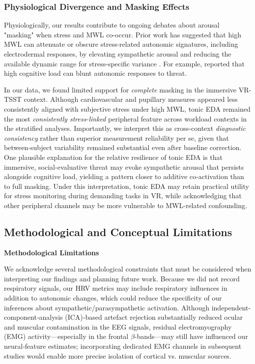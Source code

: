 \documentclass[lettersize,journal]{IEEEtran}
\begin{document}
\subsubsection{Physiological Divergence and Masking Effects}
Physiologically, our results contribute to ongoing debates about arousal "masking" when stress and MWL co-occur. Prior work has suggested that high MWL can attenuate or obscure stress-related autonomic signatures, including electrodermal responses, by elevating sympathetic arousal and reducing the available dynamic range for stress-specific variance \cite{conwayEffectMentalWorkload2013, setzDiscriminatingStressCognitive2010}. For example, \cite{conwayEffectMentalWorkload2013} reported that high cognitive load can blunt autonomic responses to threat.

In our data, we found limited support for \emph{complete} masking in the immersive VR-TSST context. Although cardiovascular and pupillary measures appeared less consistently aligned with subjective stress under high MWL, tonic EDA remained the most \emph{consistently stress-linked} peripheral feature across workload contexts in the stratified analyses. Importantly, we interpret this as cross-context \emph{diagnostic consistency} rather than superior measurement reliability per se, given that between-subject variability remained substantial even after baseline correction. One plausible explanation for the relative resilience of tonic EDA is that immersive, social-evaluative threat may evoke sympathetic arousal that persists alongside cognitive load, yielding a pattern closer to additive co-activation than to full masking. Under this interpretation, tonic EDA may retain practical utility for stress monitoring during demanding tasks in VR, while acknowledging that other peripheral channels may be more vulnerable to MWL-related confounding.

\subsection{Methodological and Conceptual Limitations}

\textbf{Methodological Limitations}

We acknowledge several methodological constraints that must be considered when interpreting our findings and planning future work. Because we did not record respiratory signals, our HRV metrics may include respiratory influences in addition to autonomic changes, which could reduce the specificity of our inferences about sympathetic/parasympathetic activation. Although independent‐component‐analysis (ICA)‐based artefact rejection substantially reduced ocular and muscular contamination in the EEG signals, residual electromyography (EMG) activity—especially in the frontal \(\beta\)-bands—may still have influenced our neural‐feature estimates; incorporating dedicated EMG channels in subsequent studies would enable more precise isolation of cortical vs. muscular sources. 
\end{document}
